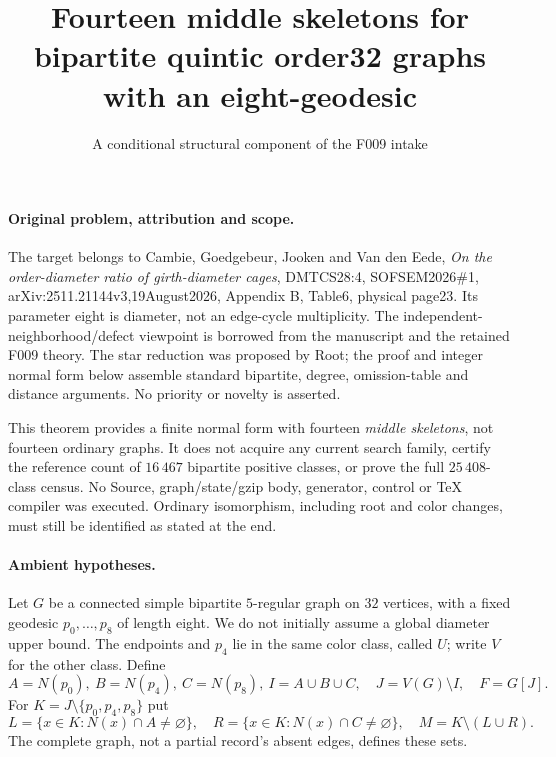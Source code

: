 \documentclass[11pt]{article}
\title{Fourteen middle skeletons for bipartite quintic order32 graphs with an eight-geodesic}
\author{A conditional structural component of the F009 intake}
\date{}
\begin{document}
\maketitle

\paragraph{Original problem, attribution and scope.}
The target belongs to Cambie, Goedgebeur, Jooken and Van den Eede,
\emph{On the order-diameter ratio of girth-diameter cages},
DMTCS28:4, SOFSEM2026\#1, arXiv:2511.21144v3,19August2026,
Appendix B, Table6, physical page23. Its parameter eight is diameter,
not an edge-cycle multiplicity. The independent-neighborhood/defect
viewpoint is borrowed from the manuscript and the retained F009 theory.
The star reduction was proposed by Root; the proof and integer normal
form below assemble standard bipartite, degree, omission-table and
distance arguments. No priority or novelty is asserted.

This theorem provides a finite normal form with fourteen \emph{middle
skeletons}, not fourteen ordinary graphs. It does not acquire any
current search family, certify the reference count of $16\,467$
bipartite positive classes, or prove the full $25\,408$-class census.
No Source, graph/state/gzip body, generator, control or TeX compiler
was executed. Ordinary isomorphism, including root and color changes,
must still be identified as stated at the end.

\paragraph{Ambient hypotheses.}
Let $G$ be a connected simple bipartite $5$-regular graph on $32$
vertices, with a fixed geodesic $p_0,\ldots,p_8$ of length eight.
We do not initially assume a global diameter upper bound.
The endpoints and $p_4$ lie in the same color class, called $U$;
write $V$ for the other class. Define
\[
 A=N(p_0),\ B=N(p_4),\ C=N(p_8),\ I=A\cup B\cup C,
 \quad J=V(G)\setminus I,\quad F=G[J].
\]
For $K=J\setminus\{p_0,p_4,p_8\}$ put
\[
 L=\{x\in K:N(x)\cap A\ne\varnothing\},\quad
 R=\{x\in K:N(x)\cap C\ne\varnothing\},\quad
 M=K\setminus(L\cup R).
\]
The complete graph, not a partial record's absent edges, defines these sets.
\end{document}
